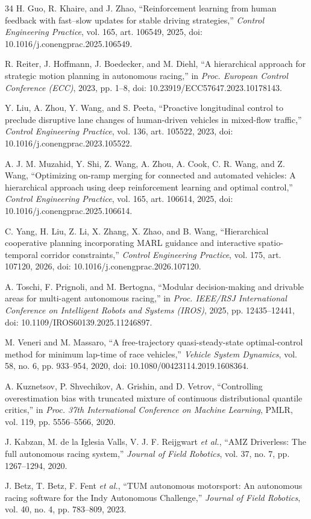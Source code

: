 \documentclass[journal,twoside,web]{ieeecolor}
\begin{document}
\begin{thebibliography}{34}
H. Guo, R. Khaire, and J. Zhao,
``Reinforcement learning from human feedback with fast--slow updates for
stable driving strategies,'' \emph{Control Engineering Practice}, vol. 165,
art. 106549, 2025, doi: 10.1016/j.conengprac.2025.106549.

R. Reiter, J. Hoffmann, J. Boedecker, and M. Diehl,
``A hierarchical approach for strategic motion planning in autonomous
racing,'' in \emph{Proc. European Control Conference (ECC)}, 2023, pp. 1--8,
doi: 10.23919/ECC57647.2023.10178143.

Y. Liu, A. Zhou, Y. Wang, and S. Peeta,
``Proactive longitudinal control to preclude disruptive lane changes of
human-driven vehicles in mixed-flow traffic,''
\emph{Control Engineering Practice}, vol. 136, art. 105522, 2023,
doi: 10.1016/j.conengprac.2023.105522.

A. J. M. Muzahid, Y. Shi, Z. Wang, A. Zhou, A. Cook, C. R. Wang, and Z. Wang,
``Optimizing on-ramp merging for connected and automated vehicles: A
hierarchical approach using deep reinforcement learning and optimal control,''
\emph{Control Engineering Practice}, vol. 165, art. 106614, 2025,
doi: 10.1016/j.conengprac.2025.106614.

C. Yang, H. Liu, Z. Li, X. Zhang, X. Zhao, and B. Wang,
``Hierarchical cooperative planning incorporating MARL guidance and
interactive spatio-temporal corridor constraints,''
\emph{Control Engineering Practice}, vol. 175, art. 107120, 2026,
doi: 10.1016/j.conengprac.2026.107120.

A. Toschi, F. Prignoli, and M. Bertogna,
``Modular decision-making and drivable areas for multi-agent autonomous
racing,'' in \emph{Proc. IEEE/RSJ International Conference on Intelligent
Robots and Systems (IROS)}, 2025, pp. 12435--12441,
doi: 10.1109/IROS60139.2025.11246897.

M. Veneri and M. Massaro,
``A free-trajectory quasi-steady-state optimal-control method for minimum
lap-time of race vehicles,''
\emph{Vehicle System Dynamics}, vol. 58, no. 6, pp. 933--954, 2020,
doi: 10.1080/00423114.2019.1608364.

A. Kuznetsov, P. Shvechikov, A. Grishin, and D. Vetrov,
``Controlling overestimation bias with truncated mixture of continuous
distributional quantile critics,'' in \emph{Proc. 37th International
Conference on Machine Learning}, PMLR, vol. 119, pp. 5556--5566, 2020.

J. Kabzan, M. de la Iglesia Valls, V. J. F. Reijgwart \emph{et al.},
``AMZ Driverless: The full autonomous racing system,''
\emph{Journal of Field Robotics}, vol. 37, no. 7, pp. 1267--1294, 2020.

J. Betz, T. Betz, F. Fent \emph{et al.},
``TUM autonomous motorsport: An autonomous racing software for the Indy
Autonomous Challenge,'' \emph{Journal of Field Robotics}, vol. 40, no. 4,
pp. 783--809, 2023.

\end{thebibliography}
\end{document}
